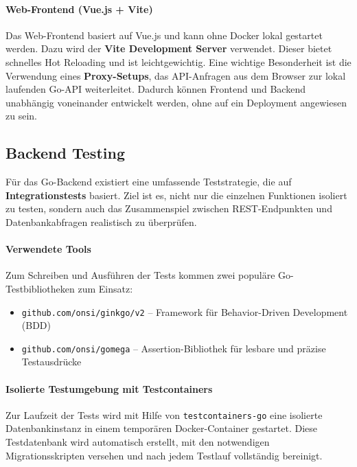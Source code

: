 \documentclass[11pt,a4paper]{article}
\begin{document}
\paragraph{Web-Frontend (Vue.js + Vite)}
Das Web-Frontend basiert auf Vue.js\cite{vuejs} und kann ohne Docker lokal gestartet werden. Dazu wird der \textbf{Vite Development Server}\cite{vite} verwendet. Dieser bietet schnelles Hot Reloading und ist leichtgewichtig. Eine wichtige Besonderheit ist die Verwendung eines \textbf{Proxy-Setups}, das API-Anfragen aus dem Browser zur lokal laufenden Go-API weiterleitet. Dadurch können Frontend und Backend unabhängig voneinander entwickelt werden, ohne auf ein Deployment angewiesen zu sein.

\subsection{Backend Testing}

Für das Go-Backend existiert eine umfassende Teststrategie, die auf \textbf{Integrationstests} basiert. Ziel ist es, nicht nur die einzelnen Funktionen isoliert zu testen, sondern auch das Zusammenspiel zwischen REST-Endpunkten und Datenbankabfragen realistisch zu überprüfen.

\paragraph{Verwendete Tools}
Zum Schreiben und Ausführen der Tests kommen zwei populäre Go-Testbibliotheken zum Einsatz:
\begin{itemize}
    \item \texttt{github.com/onsi/ginkgo/v2}\cite{ginkgo} – Framework für Behavior-Driven Development (BDD)
    \item \texttt{github.com/onsi/gomega}\cite{gomega} – Assertion-Bibliothek für lesbare und präzise Testausdrücke
\end{itemize}

\paragraph{Isolierte Testumgebung mit Testcontainers}
Zur Laufzeit der Tests wird mit Hilfe von \texttt{testcontainers-go}\cite{testcontainers} eine isolierte Datenbankinstanz in einem temporären Docker-Container\cite{docker} gestartet. Diese Testdatenbank wird automatisch erstellt, mit den notwendigen Migrationsskripten versehen und nach jedem Testlauf vollständig bereinigt.
\end{document}
